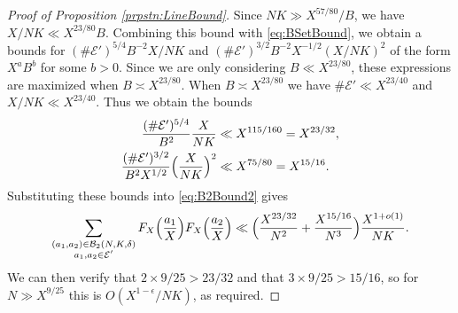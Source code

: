 \documentclass[10pt]{amsart}
\theoremstyle{plain}
\numberwithin{sblmm}{thrm}
\numberwithin{equation}{section}
\begin{document}
\begin{proof}[Proof of Proposition \ref{prpstn:LineBound}]
Since $N K\gg X^{57/80}/B$, we have $X/N K\ll X^{23/80}B$. Combining this bound with \eqref{eq:BSetBound}, we obtain a bounds for $(\#\mathcal{E}')^{5/4}B^{-2}X/N K$ and $(\#\mathcal{E}')^{3/2}B^{-2}X^{-1/2}(X/N K)^2$ of the form $X^a B^b$ for some $b>0$. Since we are only considering $B\ll X^{23/80}$, these expressions are maximized when $B\asymp X^{23/80}$. When $B\asymp X^{23/80}$ we have $\#\mathcal{E}'\ll X^{23/40}$ and $X/N K\ll X^{23/40}$. Thus we obtain the bounds
%
\begin{align*}
\frac{(\#\mathcal{E}')^{5/4}}{B^2}\frac{X}{N K}&\ll X^{115/160}=X^{23/32},\\
%
\frac{(\#\mathcal{E}')^{3/2}}{B^2 X^{1/2}}\Bigl(\frac{X}{N K}\Bigr)^2& \ll X^{75/80}=X^{15/16}.
\end{align*}
%
Substituting these bounds into \eqref{eq:B2Bound2} gives
%
\begin{align*}
\sum_{\substack{ (a_1,a_2)\in\mathcal{B}_2(N,K,\delta) \\ a_1,a_2\in\mathcal{E}' }}F_X\Bigl(\frac{a_1}{X}\Bigr)F_X\Bigl(\frac{a_2}{X}\Bigr)\ll \Bigl(\frac{X^{23/32}}{N^2}+\frac{X^{15/16}}{N^{3}}\Bigr)\frac{X^{1+o(1)}}{N K}.
\end{align*}
%
We can then verify that $2\times 9/25>23/32$ and that $3\times 9/25>15/16$, so for $N\gg X^{9/25}$ this is $O(X^{1-\epsilon}/NK)$, as required.
%
\end{proof}
%
%
%
%
%
%
%
\end{document}
